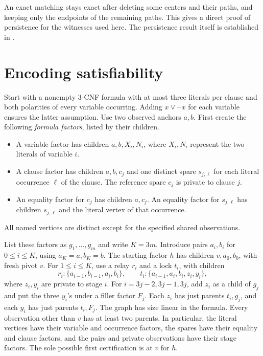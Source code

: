 \documentclass[11pt,a4paper]{amsart}
\begin{document}
An exact matching stays exact after deleting some centers and their paths, and keeping only the endpoints of the remaining paths. This gives a direct proof of persistence for the witnesses used here. The persistence result itself is established in \cite[Lemma~B.1]{preprint}.

\section{Encoding satisfiability}

Start with a nonempty 3-CNF formula with at most three literals per clause and both polarities of every variable occurring. Adding \(x\lor\neg x\) for each variable ensures the latter assumption. Use two observed anchors \(a,b\). First create the following \emph{formula factors}, listed by their children.
\begin{itemize}
\item A variable factor has children \(a,b,X_i,N_i\), where \(X_i,N_i\) represent the two literals of variable \(i\).
\item A clause factor has children \(a,b,c_j\) and one distinct spare \(s_{j,\ell}\) for each literal occurrence \(\ell\) of the clause. The reference spare \(c_j\) is private to clause \(j\).
\item An equality factor for \(c_j\) has children \(a,c_j\). An equality factor for \(s_{j,\ell}\) has children \(s_{j,\ell}\) and the literal vertex of that occurrence.
\end{itemize}
All named vertices are distinct except for the specified shared observations.

List these factors as \(g_1,\ldots,g_m\) and write \(K=3m\). Introduce pairs \(a_i,b_i\) for \(0\le i\le K\), using \(a_K=a,b_K=b\). The starting factor \(h\) has children \(v,a_0,b_0\), with fresh pivot \(v\). For \(1\le i\le K\), use a relay \(r_i\) and a lock \(t_i\), with children
\[
 r_i:\{a_{i-1},b_{i-1},a_i,b_i\},\qquad
 t_i:\{a_{i-1},a_i,b_i,z_i,y_i\},
\]
where \(z_i,y_i\) are private to stage \(i\). For \(i=3j-2,3j-1,3j\), add \(z_i\) as a child of \(g_j\) and put the three \(y_i\)'s under a filler factor \(F_j\). Each \(z_i\) has just parents \(t_i,g_j\), and each \(y_i\) has just parents \(t_i,F_j\). The graph has size linear in the formula. Every observation other than \(v\) has at least two parents. In particular, the literal vertices have their variable and occurrence factors, the spares have their equality and clause factors, and the pairs and private observations have their stage factors. The sole possible first certification is at \(v\) for \(h\).
\end{document}
